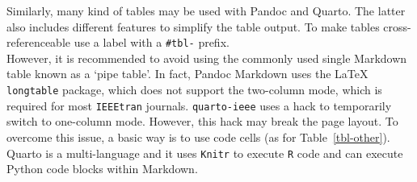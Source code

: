 \documentclass[
  journal,
]{IEEEtran}%
\begin{document}
Similarly, many kind of tables may be used with Pandoc and Quarto. The
latter also includes different features to simplify the table output. To
make tables cross-referenceable use a label with a \texttt{\#tbl-}
prefix.\\
However, it is recommended to avoid using the commonly used single
Markdown table known as a `pipe table'. In fact, Pandoc Markdown uses
the {\LaTeX} \texttt{longtable} package, which does not support the
two-column mode, which is required for most \texttt{IEEEtran} journals.
\texttt{quarto-ieee} uses a hack to temporarily switch to one-column
mode. However, this hack may break the page layout. To overcome this
issue, a basic way is to use code cells (as for Table~\ref{tbl-other}).
Quarto is a multi-language and it uses \texttt{Knitr} to execute
\texttt{R} code and can execute Python code blocks within Markdown.

\begin{table}

\caption{\label{tbl-panel}Main Caption}

\begin{minipage}{0.50\linewidth}



\end{minipage}%
%
\begin{minipage}{0.50\linewidth}



\end{minipage}%

\end{table}%
\end{document}
